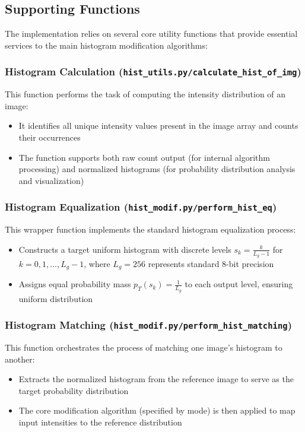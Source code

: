 \documentclass[12pt,a4paper]{article}
\begin{document}
\subsection{Supporting Functions}

The implementation relies on several core utility functions that provide essential services to the main histogram modification algorithms:

\subsubsection*{Histogram Calculation (\texttt{hist\_utils.py/calculate\_hist\_of\_img})}
This function performs the task of computing the intensity distribution of an image:

\begin{itemize}
    \item It identifies all unique intensity values present in the image array and counts their occurrences
    \item The function supports both raw count output (for internal algorithm processing) and normalized histograms (for probability distribution analysis and visualization)
\end{itemize}

\subsubsection*{Histogram Equalization (\texttt{hist\_modif.py/perform\_hist\_eq})}
This wrapper function implements the standard histogram equalization process:

\begin{itemize}
    \item Constructs a target uniform histogram with discrete levels $s_k = \frac{k}{L_g-1}$ for $k = 0,1,...,L_g-1$, where $L_g=256$ represents standard 8-bit precision
    \item Assigns equal probability mass $p_T(s_k) = \frac{1}{L_g}$ to each output level, ensuring uniform distribution
\end{itemize}


\subsubsection*{Histogram Matching (\texttt{hist\_modif.py/perform\_hist\_matching})}
This function orchestrates the process of matching one image's histogram to another:

\begin{itemize}
    \item Extracts the normalized histogram from the reference image to serve as the target probability distribution
    \item The core modification algorithm (specified by mode) is then applied to map input intensities to the reference distribution
\end{itemize}
\end{document}
